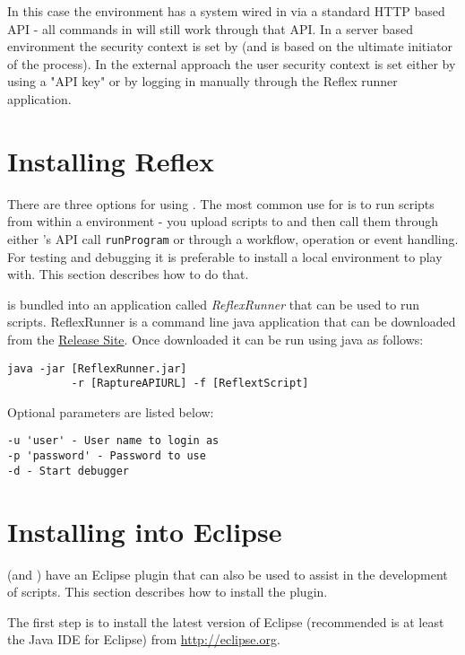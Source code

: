 In this case the environment has a \Rapture system wired in via a standard HTTP based API - all \Rapture commands in \Reflex will still work through that API. In a server based environment the security context is set by \Rapture (and is based on the ultimate initiator of the \Reflex process). In the external approach the user security context is set either by using a \Rapture "API key" or by logging in manually through the Reflex runner application.

\section{Installing Reflex}
There are three options for using \Reflex. The most common use for \Reflex is to run scripts from within a \Rapture environment - you upload scripts to \Rapture and then call them through either \Rapture's API call \Verb+runProgram+ or through a \Rapture workflow, operation or event handling. For testing and debugging it is preferable to install a local environment to play with. This section describes how to do that.

\Reflex is bundled into an application called \emph{ReflexRunner} that can be used to run \Reflex scripts. ReflexRunner is a command line java application that can be downloaded from the \href{http://incapture.github.com/RaptureRepo/release}{\Rapture Release Site}. Once downloaded it can be run using java as follows:

\begin{Verbatim}[fontsize=\small]
java -jar [ReflexRunner.jar] 
          -r [RaptureAPIURL] -f [ReflextScript]
\end{Verbatim}

Optional parameters are listed below:

\begin{Verbatim}
-u 'user' - User name to login as
-p 'password' - Password to use
-d - Start debugger
\end{Verbatim}

\section{Installing into Eclipse}
\Reflex (and \Rapture) have an Eclipse plugin that can also be used to assist in the development of \Reflex scripts. This section describes how to install the plugin.

The first step is to install the latest version of Eclipse (recommended is at least the Java IDE for Eclipse) from \url{http://eclipse.org}.

